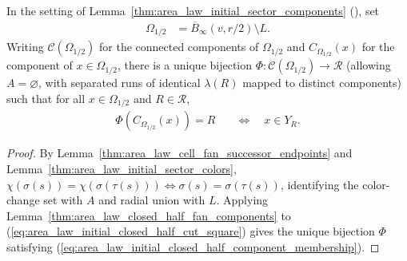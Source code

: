 \begin{lemma}
    \label{thm:area_law_initial_closed_half_components}
    \leanok
    In the setting of Lemma~\ref{thm:area_law_initial_sector_components} (\cite[Section~11]{OpenAI2026AreaLaw}), set
    \begin{align}
        \Omega_{1/2} & =\overline B_\infty(v,r/2)\setminus L.
        \label{eq:area_law_initial_closed_half_cut_square}
    \end{align}
    Writing $\mathcal C(\Omega_{1/2})$ for the connected components of $\Omega_{1/2}$ and $C_{\Omega_{1/2}}(x)$ for the component of $x\in\Omega_{1/2}$, there is a unique bijection $\Phi:\mathcal C(\Omega_{1/2})\to\mathcal R$ (allowing $A=\varnothing$, with separated runs of identical $\lambda(R)$ mapped to distinct components) such that for all $x\in\Omega_{1/2}$ and $R\in\mathcal R$,
    \begin{align}
        \Phi(C_{\Omega_{1/2}}(x))=R
         & \quad\Longleftrightarrow\quad x\in Y_R.
        \label{eq:area_law_initial_closed_half_component_membership}
    \end{align}
\end{lemma}
\begin{proof}\leanok
    By Lemma~\ref{thm:area_law_cell_fan_successor_endpoints} and Lemma~\ref{thm:area_law_initial_sector_colors}, $\chi(\sigma(s))=\chi(\sigma(\tau(s)))\iff\sigma(s)=\sigma(\tau(s))$, identifying the color-change set with $A$ and radial union with $L$.
    Applying Lemma~\ref{thm:area_law_closed_half_fan_components} to (\ref{eq:area_law_initial_closed_half_cut_square}) gives the unique bijection $\Phi$ satisfying (\ref{eq:area_law_initial_closed_half_component_membership}).
\end{proof}

